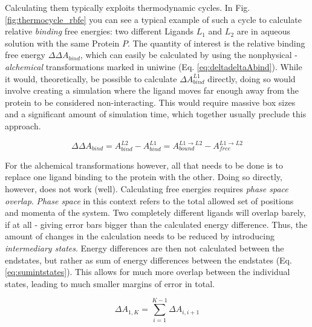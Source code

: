 \documentclass[oneside]{scrreprt}
\begin{document}
Calculating them typically exploits thermodynamic cycles. In Fig. \ref{fig:thermocycle_rbfe} you can see a typical example of such a cycle to calculate relative \emph{binding} free energies: two different Ligands $L_1$ and $L_2$ are in aqueous solution with the same Protein $P$. The quantity of interest is the relative binding free energy $\Delta \Delta A_{bind}$, which can easily be calculated by using the nonphysical - \emph{alchemical} transformations marked in uniwine (Eq. \ref{eq:deltadeltaAbind}). While it would, theoretically, be possible to calculate $\Delta A^{L1}_{bind}$ directly, doing so would involve creating a simulation where the ligand moves far enough away from the protein to be considered non-interacting. This would require massive box sizes and a significant amount of simulation time, which together usually preclude this approach.

\begin{equation}
    \Delta \Delta A_{bind} = A^{L2}_{bind}-A^{L1}_{bind}=A^{L1\rightarrow L2}_{bound}-A^{L1\rightarrow L2}_{free}
    \label{eq:deltadeltaAbind}
\end{equation}


For the alchemical transformations however, all that needs to be done is to replace one ligand binding to the protein with the other. Doing so directly, however, does not work (well). Calculating free energies requires \emph{phase space overlap}. \emph{Phase space} in this context refers to the total allowed set of positions and momenta of the system. Two completely different ligands will overlap barely, if at all - giving error bars bigger than the calculated energy difference. Thus, the amount of changes in the calculation needs to be reduced by introducing \emph{intermediary states}. Energy differences are then not calculated between the endstates, but rather as sum of energy differences between the endstates (Eq. \ref{eq:sumintstates}). This allows for much more overlap between the individual states, leading to much smaller margins of error in total.

\begin{equation}
    \Delta A_{1,K} = \sum^{K-1}_{i=1} \Delta A_{i,i+1}
    \label{eq:sumintstates}
\end{equation}
\end{document}
